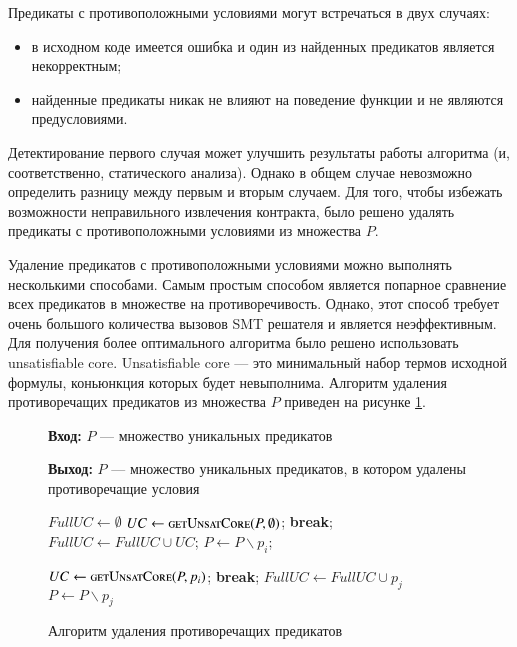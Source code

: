 Предикаты с противоположными условиями могут встречаться в двух случаях:
\begin{itemize}
\item в исходном коде имеется ошибка и один из найденных предикатов является некорректным;
\item найденные предикаты никак не влияют на поведение функции и не являются предусловиями.
\end{itemize}
Детектирование первого случая может улучшить результаты работы алгоритма (и, соответственно, статического анализа). Однако в общем случае невозможно определить разницу между первым и вторым случаем. Для того, чтобы избежать возможности неправильного извлечения контракта, было решено удалять предикаты с противоположными условиями из множества $P$.

Удаление предикатов с противоположными условиями можно выполнять несколькими способами. Самым простым способом является попарное сравнение всех предикатов в множестве на противоречивость. Однако, этот способ требует очень большого количества вызовов SMT решателя и является неэффективным. Для получения более оптимального алгоритма было решено использовать unsatisfiable core. Unsatisfiable core\cite{unsatcore} --- это минимальный набор термов исходной формулы, коньюнкция которых будет невыполнима.  Алгоритм удаления противоречащих предикатов из  множества $P$ приведен на рисунке \ref{image:deletingAlgoritm}.
\begin{figure}[h!]
\textbf{Вход:} $P$ --- множество уникальных предикатов

\textbf{Выход:} $P$ --- множество уникальных предикатов, в котором удалены противоречащие условия

\begin{algorithmic}[1]
\State $FullUC \leftarrow \emptyset$
	\State $UC \leftarrow \Call{getUnsatCore}{P, \emptyset}$;
		\State \textbf{break};
	\EndIf
	\State $FullUC \leftarrow FullUC \cup UC$;
		\State $P \leftarrow P \backslash p_i$;
	\EndFor
\EndWhile

		\State $UC \leftarrow \Call{getUnsatCore}{P, p_i}$;
			\State \textbf{break};
		\EndIf
				\State $FullUC \leftarrow FullUC \cup p_j$
				\State $P \leftarrow P \backslash p_j$
			\EndIf
		\EndFor
	\EndFor
\EndWhile
\end{algorithmic}
\caption{Алгоритм удаления противоречащих предикатов}
\label{image:deletingAlgoritm}
\end{figure}

